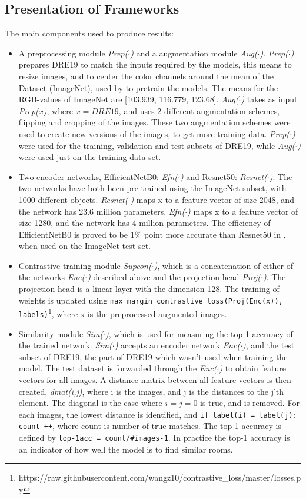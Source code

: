 \subsection{Presentation of Frameworks}
The main components used to produce results:
\begin{itemize}
  \item {A preprocessing module \textit{Prep($\cdot$)} and a augmentation module \textit{Aug($\cdot$)}. \textit{Prep($\cdot$)} prepares DRE19 to match the inputs required by the models, this means to resize images, and to center the color channels around the mean of the Dataset (ImageNet), used by to pretrain the models. The means for the RGB-values of ImageNet are [103.939, 116.779, 123.68]. \textit{Aug($\cdot$)} takes as input \textit{Prep($x$)}, where $x=DRE19$, and uses 2 different augmentation schemes, flipping and cropping of the images. These two augmentation schemes were used to create new versions of the images, to get more training data. \textit{Prep($\cdot$)} were used for the training, validation and test subsets of DRE19, while \textit{Aug($\cdot$)} were used just on the training data set.}
  \item {Two encoder networks, EfficientNetB0: \textit{Efn($\cdot$)} and Resnet50: \textit{Resnet($\cdot$)}. The two networks have both been pre-trained using the ImageNet subset, with 1000 different objects. \textit{Resnet($\cdot$)} maps x to a feature vector of size 2048, and the network has 23.6 million parameters. \textit{Efn($\cdot$)} maps x to a feature vector of size 1280, and the network has 4 million parameters. The efficiency of EfficientNetB0 is proved to be 1\% point more accurate than Resnet50 in \autocite{tan2020efficientnet}, when used on the ImageNet test set. }
  \item {Contrastive training module \textit{Supcon($\cdot$)}, which is a concatenation of either of the networks \textit{Enc($\cdot$)} described above and the projection head \textit{Proj($\cdot$)}. The projection head is a linear layer with the dimension 128. The training of weights is updated using \texttt{max\_margin\_contrastive\_loss(Proj(Enc(x)), labels)}\footnote{https://raw.githubusercontent.com/wangz10/contrastive\_loss/master/losses.py}, where x is the preprocessed augmented images.}
  \item {Similarity module \textit{Sim($\cdot$)}, which is used for measuring the top 1-accuracy of the trained network. \textit{Sim($\cdot$)} accepts an encoder network \textit{Enc($\cdot$)}, and the test subset of DRE19, the part of DRE19 which wasn't used when training the model. The test dataset is forwarded through the \textit{Enc($\cdot$)} to obtain feature vectors for all images. A distance matrix  between all feature vectors is then created, \textit{dmat(i,j)}, where i is the images, and j is the distances to the j'th element. The diagonal is the case where $i=j=0$ is true, and is removed. For each images, the lowest distance is identified, and \texttt{if label(i) = label(j): count ++}, where count is number of true matches. The top-1 accuracy is defined by  \texttt{top-1acc = count/\#images-1}. In practice the top-1 accuracy is an indicator of how well the model is to find similar rooms.}
\end{itemize}
